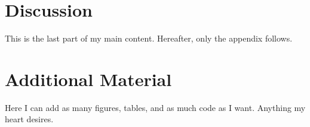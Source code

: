 \documentclass[11pt, todonotes]{IAUthesis}
\begin{document}
\chapter{Discussion}
This is the last part of my main content.
Hereafter, only the appendix follows.

\cleardoublepage\pagestyle{appendix}\appendix
\printnoidxglossary[title={\abbrtitle}]

\chapter{Additional Material}
Here I can add as many figures, tables, and as much code as I want.
Anything my heart desires.

\printbibliography[heading=bibnumbered, title={\bibtitle}]

\listoftodos
\end{document}
